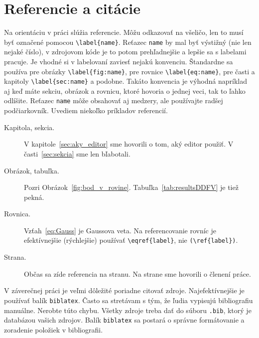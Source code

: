 \section{Referencie a citácie}
Na orientáciu v práci slúžia referencie. Môžu odkazovať na všeličo, len to musí byť označené pomocou \verb|\label{name}|. Reťazec \verb|name| by mal byť výstižný (nie len nejaké číslo), v zdrojovom kóde je to potom prehľadnejšie a lepšie sa s labelami pracuje. Je vhodné si v labelovaní zaviesť nejakú konvenciu. Štandardne sa používa pre obrázky \verb|\label{fig:name}|, pre rovnice \verb|\label{eq:name}|, pre časti a kapitoly \verb|\label{sec:name}| a podobne. Takáto konvencia je výhodná napríklad aj keď máte sekciu, obrázok a rovnicu, ktoré hovoria o jednej veci, tak to ľahko odlíšite. Reťazec \verb|name| môže obsahovať aj medzery, ale používajte radšej podčiarkovník. Uvediem niekoľko príkladov referencií.
\begin{description}
	\item[Kapitola, sekcia.] V kapitole~\ref{sec:aky_editor} sme hovorili o tom, aký editor použiť. V časti~\ref{sec:sekcia} sme len bľabotali.
	\item[Obrázok, tabuľka.] Pozri Obrázok~\ref{fig:bod_v_rovine}. Tabuľka~\ref{tab:resultsDDFV} je tiež pekná.
	\item[Rovnica.] Vzťah~\eqref{eq:Gauss} je Gaussova veta. Na referencovanie rovníc je efektívnejšie (rýchlejšie) používať \verb|\eqref{label}|, nie \verb|(\ref{label})|.
	\item[Strana.] Občas sa zíde referencia na stranu. Na strane \pageref{sec:clenenie} sme hovorili o členení práce.
\end{description}

V záverečnej práci je veľmi dôležité poriadne citovať zdroje. Najefektívnejšie je používať balík \verb|biblatex|. Často sa stretávam s tým, že ľudia vypisujú bibliografiu  manuálne. Nerobte túto chybu. Všetky zdroje treba dať do súboru \verb|.bib|, ktorý je databázou vašich zdrojov. Balík \verb|biblatex| sa postará o správne formátovanie a zoradenie položiek v bibliografii.

